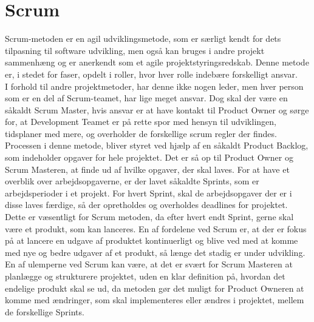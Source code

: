 \section*{Scrum}
Scrum-metoden er en agil udviklingsmetode, som er særligt kendt for dets tilpasning til software udvikling, men også kan bruges i andre projekt sammenhæng og er anerkendt som et agile projektstyringsredskab. Denne metode er, i stedet for faser, opdelt i roller, hvor hver rolle indebære forskelligt ansvar.\cite{ScrumRoles} \\
I forhold til andre projektmetoder, har denne ikke nogen leder, men hver person som er en del af Scrum-teamet, har lige meget ansvar. Dog skal der være en såkaldt Scrum Master, hvis ansvar er at have kontakt til Product Owner og sørge for, at Development Teamet er på rette spor med hensyn til udviklingen, tidsplaner med mere, og overholder de forskellige scrum regler der findes. Processen i denne metode, bliver styret ved hjælp af en såkaldt Product Backlog, som indeholder opgaver for hele projektet. Det er så op til Product Owner og Scrum Masteren, at finde ud af hvilke opgaver, der skal laves. For at have et overblik over arbejdsopgaverne, er der lavet såkaldte Sprints, som er arbejdsperioder i et projekt. For hvert Sprint, skal de arbejdsopgaver der er i disse laves færdige, så der opretholdes og overholdes deadlines for projektet. Dette er væsentligt for Scrum metoden, da efter hvert endt Sprint, gerne skal være et produkt, som kan lanceres. En af fordelene ved Scrum er, at der er fokus på at lancere en udgave af produktet kontinuerligt og blive ved med at komme med nye og bedre udgaver af et produkt, så længe det stadig er under udvikling. En af ulemperne ved Scrum kan være, at det er svært for Scrum Masteren at planlægge og strukturere projektet, uden en klar definition på, hvordan det endelige produkt skal se ud, da metoden gør det muligt for Product Owneren at komme med ændringer, som skal implementeres eller ændres i projektet, mellem de forskellige Sprints.\cite{SCRUM}\\
\\
